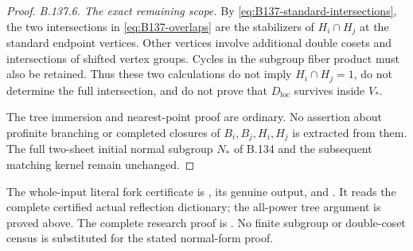 \begin{proof}
\emph{B.137.6. The exact remaining scope.}
By \eqref{eq:B137-standard-intersections}, the two
intersections in \eqref{eq:B137-overlaps} are the
stabilizers of $H_i\cap H_j$ at the standard endpoint
vertices. Other vertices involve additional double cosets
and intersections of shifted vertex groups. Cycles in the
subgroup fiber product must also be retained. Thus these
two calculations do not imply $H_i\cap H_j=1$, do not
determine the full intersection, and do not prove that
$D_{\mathrm{loc}}$ survives inside $V_*$.

The tree immersion and nearest-point proof are ordinary.
No assertion about profinite branching or completed
closures of $B_i,B_j,H_i,H_j$ is extracted from them.
The full two-sheet initial normal subgroup $N_*$ of B.134
and the subsequent matching kernel remain unchanged.
\end{proof}

\begingroup\raggedright\footnotesize
The whole-input literal fork certificate is
,
its genuine output, and
.
It reads the complete certified actual reflection dictionary;
the all-power tree argument is proved above. The complete
research proof is
.
No finite subgroup or double-coset census is substituted for
the stated normal-form proof.
\par\endgroup
